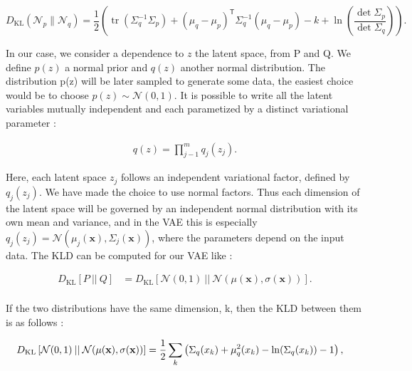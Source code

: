 \documentclass[11pt, english]{article}
\begin{document}
\begin{equation} 
D_{\text{KL}}({\mathcal {N}}_{p}\parallel {\mathcal {N}}_{q})={\frac {1}{2}}\left(\operatorname {tr} \left(\Sigma _{q}^{-1}\Sigma _{p}\right)+(\mu _{q}-\mu _{p})^{\mathsf {T}}\Sigma _{q}^{-1}(\mu _{q}-\mu _{p})-k+\ln \left({\frac {\det \Sigma _{p}}{\det \Sigma _{q}}}\right)\right).
\end{equation}



In our case, we consider a dependence to $z$ the latent space, from P and Q. We define $p(z)$ a normal prior and $q(z)$ another normal distribution. The distribution p(z) will be later sampled to generate some data, the easiest choice would be to choose $p(z) \sim \mathcal{N}(0,1)$. It is possible to write all the latent variables mutually independent and each parametized by a distinct variational parameter \cite{rapport_stage_cyran}:

\begin{align}
    q(z) = \prod_{j-1}^{m}q_j(z_j).
\end{align}


Here, each latent space $z_j$ follows an independent variational factor, defined by $q_j(z_j)$. We have made the choice to use normal factors. Thus each dimension of the latent space will be governed by an independent normal distribution with its own mean and variance, and in the VAE this is especially $q_j(z_j) = \mathcal{N}( \mu_j (\textbf{x}), \Sigma_j(\textbf{x}))$, where the parameters depend on the input data. The KLD can be computed for our VAE like : 



\begin{equation}
\begin{split}
D_{\text{KL}}\left[P \: || \: Q \right] &=   D_{\text{KL}}\left[ \mathcal{N}(0,1) \: || \:  \mathcal{N}(\mu(\textbf{x}) , \sigma(\textbf{x})) \right].\\
\end{split}
\end{equation}

If the two distributions have the same dimension, k, then the KLD between them is as follows :

\begin{equation}
\begin{split}
D_{\text{KL}}\left[ \mathcal{N}(0,1) \: || \:  \mathcal{N}(\mu(\textbf{x}) , \sigma(\textbf{x})) \right]
&= {1 \over 2} \sum_{k} \left( \Sigma_q(x_k) +\mu_q^{2}(x_k) - \ln(\Sigma_q(x_k) ) - 1 \right),
\end{split}
\end{equation}
\end{document}
